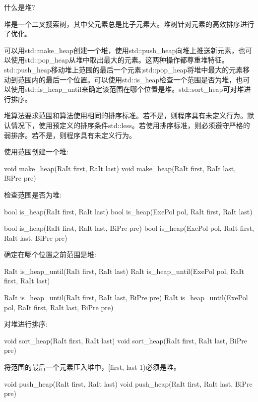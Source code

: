 

\begin{myTip}{什么是堆?}
	
堆是一个二叉搜索树，其中父元素总是比子元素大。堆树针对元素的高效排序进行了优化。
\end{myTip}

可以用std::make\_heap创建一个堆，使用std::push\_heap向堆上推送新元素，也可以使用std::pop\_heap从堆中取出最大的元素。这两种操作都尊重堆特征。std::push\_heap移动堆上范围的最后一个元素;std::pop\_heap将堆中最大的元素移动到范围内的最后一个位置。可以使用std::is\_heap检查一个范围是否为堆，也可以使用std::is\_heap\_until来确定该范围在哪个位置是堆。std::sort\_heap可对堆进行排序。

堆算法要求范围和算法使用相同的排序标准。若不是，则程序具有未定义行为。默认情况下，使用预定义的排序条件std::less。若使用排序标准，则必须遵守严格的弱排序。若不是，则程序具有未定义行为。

使用范围创建一个堆:

\begin{cpp}
void make_heap(RaIt first, RaIt last)
void make_heap(RaIt first, RaIt last, BiPre pre)
\end{cpp}

检查范围是否为堆:

\begin{cpp}
bool is_heap(RaIt first, RaIt last)
bool is_heap(ExePol pol, RaIt first, RaIt last)

bool is_heap(RaIt first, RaIt last, BiPre pre)
bool is_heap(ExePol pol, RaIt first, RaIt last, BiPre pre)
\end{cpp}

确定在哪个位置之前范围是堆:

\begin{cpp}
RaIt is_heap_until(RaIt first, RaIt last)
RaIt is_heap_until(ExePol pol, RaIt first, RaIt last)

RaIt is_heap_until(RaIt first, RaIt last, BiPre pre)
RaIt is_heap_until(ExePol pol, RaIt first, RaIt last, BiPre pre)
\end{cpp}

对堆进行排序:

\begin{cpp}
void sort_heap(RaIt first, RaIt last)
void sort_heap(RaIt first, RaIt last, BiPre pre)
\end{cpp}

将范围的最后一个元素压入堆中，[first, last-1)必须是堆。

\begin{cpp}
void push_heap(RaIt first, RaIt last)
void push_heap(RaIt first, RaIt last, BiPre pre)
\end{cpp}

